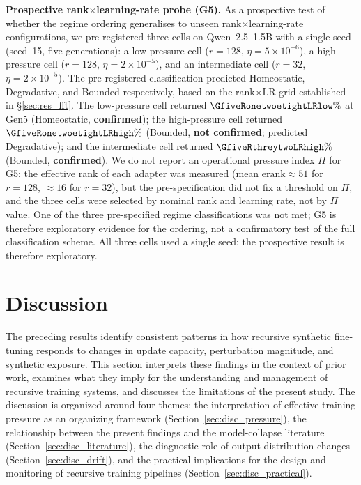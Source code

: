 \documentclass[a4paper,fleqn]{cas-dc}
\newif\ifshowchanges
\newcommand{\rev}[1]{\ifshowchanges{\color{blue}#1}\else{#1}\fi}
\begin{document}
\rev{\textbf{Prospective rank$\times$learning-rate probe (G5).}
As a prospective test of whether the regime ordering generalises to unseen
rank$\times$learning-rate configurations, we pre-registered three cells on
Qwen~2.5~1.5B with a single seed (seed~15, five generations): a low-pressure
cell ($r=128$, $\eta=5\times10^{-6}$), a high-pressure cell ($r=128$,
$\eta=2\times10^{-5}$), and an intermediate cell ($r=32$, $\eta=2\times10^{-5}$).
The pre-registered classification predicted Homeostatic, Degradative, and
Bounded respectively, based on the rank$\times$LR grid established in
\S\ref{sec:res_fft}.
The low-pressure cell returned $\GfiveRonetwoetightLRlow\%$ at Gen5
(Homeostatic, \textbf{confirmed}); the high-pressure cell returned
$\GfiveRonetwoetightLRhigh\%$ (Bounded, \textbf{not confirmed}; predicted
Degradative); and the intermediate cell returned $\GfiveRthreytwoLRhigh\%$
(Bounded, \textbf{confirmed}).
We do not report an operational pressure index $\Pi$ for G5: the effective rank
of each adapter was measured (mean $\mathrm{erank}\approx51$ for $r=128$,
$\approx16$ for $r=32$), but the pre-specification did not fix a threshold on
$\Pi$, and the three cells were selected by nominal rank and learning rate, not
by $\Pi$ value. One of the three pre-specified regime classifications was not
met; G5 is therefore exploratory evidence for the ordering, not a confirmatory
test of the full classification scheme.
All three cells used a single seed; the prospective result is therefore exploratory.}
\section{Discussion}\label{sec:discussion}

The preceding results identify consistent patterns in how recursive synthetic
fine-tuning responds to changes in update capacity, perturbation magnitude, and
synthetic exposure. This section interprets these findings in the context of
prior work, examines what they imply for the understanding and management of
recursive training systems, and discusses the limitations of the present study.
The discussion is organized around four themes: the interpretation of effective
training pressure as an organizing framework
(Section~\ref{sec:disc_pressure}), the relationship between the present findings
and the model-collapse literature (Section~\ref{sec:disc_literature}), the
diagnostic role of output-distribution changes (Section~\ref{sec:disc_drift}),
and the practical implications for the design and monitoring of recursive
training pipelines (Section~\ref{sec:disc_practical}).
\end{document}
